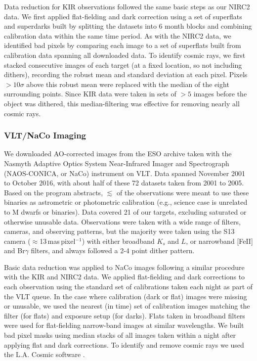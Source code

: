 \documentclass[twocolumn]{aastex62}
\begin{document}
Data reduction for KIR observations followed the same basic steps as our NIRC2 data. We first applied flat-fielding and dark correction using a set of superflats and superdarks built by splitting the datasets into 6 month blocks and combining calibration data within the same time period. As with the NIRC2 data, we identified bad pixels by comparing each image to a set of superflats built from calibration data spanning all downloaded data. To identify cosmic rays, we first stacked consecutive images of each target (at a fixed location, so not including dithers), recording the robust mean and standard deviation at each pixel. Pixels $>10\sigma$ above this robust mean were replaced with the median of the eight surrounding points. Since KIR data were taken in sets of $>5$ images before the object was dithered, this median-filtering was effective for removing nearly all cosmic rays.


\subsubsection{VLT/NaCo Imaging}

We downloaded AO-corrected images from the ESO archive taken with the Nasmyth Adaptive Optics System Near-Infrared Imager and Spectrograph (NAOS-CONICA, or NaCo) instrument on VLT. Data spanned November 2001 to October 2016, with about half of these 72 datasets taken from 2001 to 2005. Based on the program abstracts, $\lesssim$ of the observations were meant to use these binaries as astrometric or photometric calibration (e.g., science case is unrelated to M dwarfs or binaries). Data covered 21 of our targets, excluding saturated or otherwise unusable data. Observations were taken with a wide range of filters, cameras, and observing patterns, but the majority were taken using the S13 camera ($\approx$13\,mas\,pixel$^{-1}$) with either broadband $K_s$ and $L$, or narrowband [FeII] and Br$\gamma$ filters, and always followed a 2-4 point dither pattern. 

Basic data reduction was applied to NaCo images following a similar procedure with the KIR and NIRC2 data. We applied flat-fielding and dark corrections to each observation using the standard set of calibrations taken each night as part of the VLT queue. In the case where calibration (dark or flat) images were missing or unusable, we used the nearest (in time) set of calibration images matching the filter (for flats) and exposure setup (for darks). Flats taken in broadband filters were used for flat-fielding narrow-band images at similar wavelengths. We built bad pixel masks using median stacks of all images taken within a night after applying flat and dark corrections. To identify and remove cosmic rays we used the L.A. Cosmic software \citep{2001PASP..113.1420V}.
\end{document}

